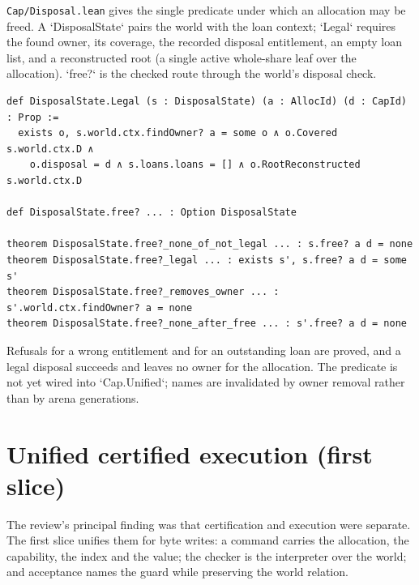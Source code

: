 \documentclass[10pt,a4paper]{article}
\newcommand{\file}[1]{\texttt{\small #1}}
\begin{document}
\file{Cap/Disposal.lean} gives the single predicate under which an allocation may
be freed. A `DisposalState` pairs the world with the loan context; `Legal` requires
the found owner, its coverage, the recorded disposal entitlement, an empty loan
list, and a reconstructed root (a single active whole-share leaf over the
allocation). `free?` is the checked route through the world's disposal check.

\begin{lstlisting}[caption={\file{Cap/Disposal.lean}.}]
def DisposalState.Legal (s : DisposalState) (a : AllocId) (d : CapId) : Prop :=
  exists o, s.world.ctx.findOwner? a = some o ∧ o.Covered s.world.ctx.D ∧
    o.disposal = d ∧ s.loans.loans = [] ∧ o.RootReconstructed s.world.ctx.D

def DisposalState.free? ... : Option DisposalState

theorem DisposalState.free?_none_of_not_legal ... : s.free? a d = none
theorem DisposalState.free?_legal ... : exists s', s.free? a d = some s'
theorem DisposalState.free?_removes_owner ... : s'.world.ctx.findOwner? a = none
theorem DisposalState.free?_none_after_free ... : s'.free? a d = none
\end{lstlisting}

Refusals for a wrong entitlement and for an outstanding loan are proved, and a
legal disposal succeeds and leaves no owner for the allocation. The predicate is
not yet wired into `Cap.Unified`; names are invalidated by owner removal rather
than by arena generations.

\section{Unified certified execution (first slice)}

The review's principal finding was that certification and execution were separate.
The first slice unifies them for byte writes: a command carries the allocation, the
capability, the index and the value; the checker is the interpreter over the world;
and acceptance names the guard while preserving the world relation.
\end{document}
